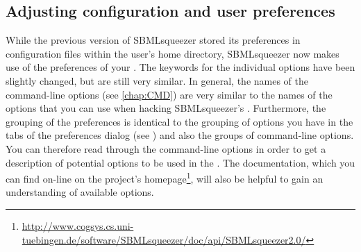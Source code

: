 \subsection{Adjusting configuration and user preferences}

While the previous version of SBMLsqueezer stored its preferences in configuration files within the user's home directory, SBMLsqueezer now makes use of the preferences of your \OS.
The keywords for the individual options have been slightly changed, but are still very similar.
In general, the names of the command-line options (see \vref{chap:CMD}) are very similar to the names of the options that you can use when hacking SBMLsqueezer's \API.
Furthermore, the grouping of the preferences is identical to the grouping of options you have in the tabs of the preferences dialog (see ) and also the groups of command-line options.
You can therefore read through the command-line options in order to get a description of potential options to be used in the \API.
The \Java \API documentation, which you can find on-line on the project's homepage\footnote{\url{http://www.cogsys.cs.uni-tuebingen.de/software/SBMLsqueezer/doc/api/SBMLsqueezer2.0/}}, will also be helpful to gain an understanding of available options.

